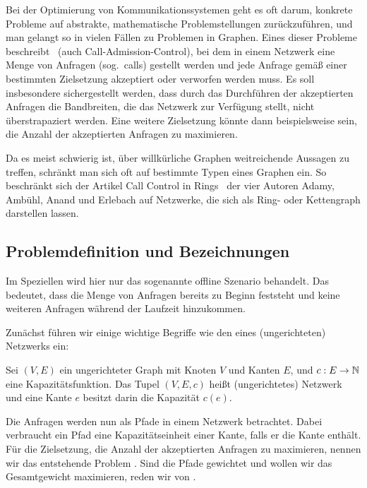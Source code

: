 Bei der Optimierung von Kommunikationssystemen geht es oft darum, konkrete Probleme auf abstrakte, mathematische 
Problemstellungen zurückzuführen, und man gelangt so in vielen Fällen zu Problemen in Graphen.
Eines dieser Probleme beschreibt \CallControl\ (auch Call-Admission-Control), bei dem
in einem Netzwerk eine Menge von Anfragen (sog.\ calls) gestellt werden und jede Anfrage gemäß einer bestimmten Zielsetzung
akzeptiert oder verworfen werden muss.
Es soll insbesondere sichergestellt werden, dass durch das Durchführen der akzeptierten Anfragen die Bandbreiten,
die das Netzwerk zur Verfügung stellt, nicht überstrapaziert werden.
Eine weitere Zielsetzung könnte dann beispielsweise sein, die Anzahl der akzeptierten Anfragen zu maximieren.

Da es meist schwierig ist, über willkürliche Graphen weitreichende Aussagen zu treffen, schränkt
man sich oft auf bestimmte Typen eines Graphen ein.
So beschränkt sich der Artikel \glqq Call Control in Rings\grqq\ \cite{paper} der vier Autoren Adamy, Ambühl, Anand und Erlebach auf Netzwerke,
die sich als Ring- oder Kettengraph darstellen lassen.

\subsection{Problemdefinition und Bezeichnungen}
Im Speziellen wird hier nur das sogenannte offline Szenario behandelt.
Das bedeutet, dass die Menge von Anfragen bereits zu Beginn feststeht und keine weiteren Anfragen während der
Laufzeit hinzukommen.

Zunächst führen wir einige wichtige Begriffe wie den eines (ungerichteten) Netzwerks ein:

\begin{definition}[Netzwerk]
	Sei $(V,E)$ ein ungerichteter Graph mit Knoten $V$ und Kanten $E$, und $c: E \to \mathbb N$ eine Kapazitätsfunktion.
	Das Tupel $(V,E,c)$ heißt (ungerichtetes) Netzwerk und eine Kante $e$ besitzt darin die Kapazität $c(e)$.
\end{definition}

Die Anfragen werden nun als Pfade in einem Netzwerk betrachtet.
Dabei verbraucht ein Pfad eine Kapazitätseinheit einer Kante, falls er die Kante enthält.
Für die Zielsetzung, die Anzahl der akzeptierten Anfragen zu maximieren, nennen wir das entstehende Problem \CallControl.
Sind die Pfade gewichtet und wollen wir das Gesamtgewicht maximieren, reden wir von \WeightedCallControl.

